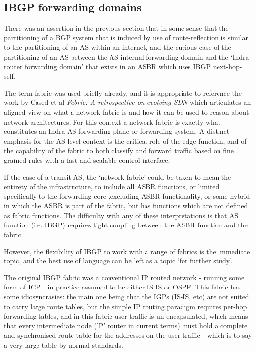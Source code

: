 \subsection{IBGP forwarding domains}

There was an assertion in the previous section that in some sense that the partitioning of a BGP system that is induced by use of route-reflection is similar to the partitioning of an AS within an internet, and the curious case of the partitioning of an AS between the AS internal forwarding domain and the `Indra-router forwarding domain' that exists in an ASBR which uses IBGP next-hop-self.

\medskip

The term fabric was used briefly already, and it is appropriate to reference the work by Cased et al \textit{Fabric: A retrospective on evolving SDN}\cite{Casado2012} which articulates an aligned view on what a network fabric is and how it can be used to reason about network architectures.  For this context a network fabric is exactly what constitutes an Indra-AS forwarding plane or forwarding system.  A distinct emphasis for the AS level context is the critical role of the edge function, and of the capability of the fabric to both classify and forward traffic based on fine grained rules with a fast and scalable control interface.

If the case of a transit AS, the  `network fabric' could be taken to mean the entirety of the infrastructure, to include all ASBR functions, or limited specifically to the forwarding core ,excluding ASBR functionality, or some hybrid in which the ASBR is part of the fabric, but has functions which are not defined as fabric functions.  The difficulty with any of these interpretations is that AS function (i.e. IBGP) requires tight coupling between the  ASBR function and the fabric.

However, the flexibility of IBGP to work with a range of fabrics is the immediate topic, and the best use of language can be left as a topic `for further study'.

\medskip

The original IBGP fabric was a conventional IP routed network - running some form of IGP - in practice assumed to be either IS-IS or OSPF.  This fabric has some idiosyncrasies: the main one being that the IGPs (IS-IS, etc) are not suited to carry large route tables, but the simple IP routing paradigm requires per-hop forwarding tables, and in this fabric user traffic is un encapsulated, which means that every intermediate node ('P' router in current terms) must hold a complete and synchronised route table for the addresses on the user traffic - which is to say a very large table by normal standards.

